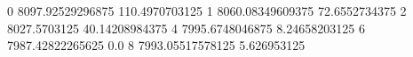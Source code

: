 0 8097.92529296875 110.4970703125
1 8060.08349609375 72.6552734375
2 8027.5703125 40.14208984375
4 7995.6748046875 8.24658203125
6 7987.42822265625 0.0
8 7993.05517578125 5.626953125
